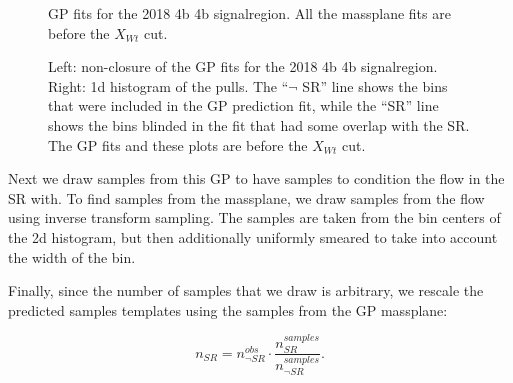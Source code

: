 \def\valreg{4b}
\def\vallabel{4b signal}%
\def\figpath{figures/flows/\valreg/}

\begin{figure}[ht]
    \centering
    \caption{GP fits for the 2018 4b \vallabel region. All the massplane fits are before the $X_{Wt}$ cut.}
    \label{fig:gp-\valreg}
\end{figure}	
	
\begin{figure}[ht]
    \centering
    \caption{Left: non-closure of the GP fits for the 2018 4b \vallabel region. 
    Right: 1d histogram of the pulls. The ``$\neg$ SR'' line shows the bins that were included in the GP prediction fit, while the ``SR'' line shows the bins blinded in the fit that had some overlap with the SR.
    The GP fits and these plots are before the $X_{Wt}$ cut.
    }
    \label{fig:gp-\valreg}
\end{figure}

Next we draw samples from this GP to have samples to condition the flow in the SR with.
To find samples from the massplane, we draw samples from the flow using inverse transform sampling.
The samples are taken from the bin centers of the 2d histogram, but then additionally uniformly smeared to take into account the width of the bin.

Finally, since the number of samples that we draw is arbitrary, we rescale the predicted samples templates using the samples from the GP massplane:

\begin{equation}
	n_{SR} = n_{\neg SR}^{obs} \cdot \frac{n_{SR}^{samples}}{n_{\neg SR}^{samples}}.
\end{equation}


